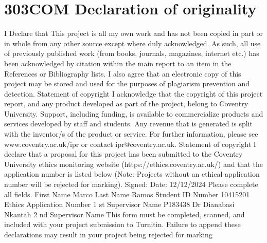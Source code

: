 \section*{303COM Declaration of originality}
I Declare that This project is all my own work and has not been 
copied in part or in whole from any
other source except where duly acknowledged. As such, all use of 
previously published work (from
books, journals, magazines, internet etc.) has been acknowledged 
by citation within the main report
to an item in the References or Bibliography lists. I also agree 
that an electronic copy of this project
may be stored and used for the purposes of plagiarism prevention 
and detection.
Statement of copyright
I acknowledge that the copyright of this project report, and any 
product developed as part of the
project, belong to Coventry University. Support, including 
funding, is available to commercialize
products and services developed by staff and students. Any 
revenue that is generated is split with the
inventor/s of the product or service. For further information, 
please see www.coventry.ac.uk/ipr or
contact ipr@coventry.ac.uk.
Statement of copyright
I declare that a proposal for this project has been submitted to 
the Coventry University ethics
monitoring website (https://ethics.coventry.ac.uk/) and that the 
application number is listed below
(Note: Projects without an ethical application number will be 
rejected for marking).
Signed: Date: 12/12/2024
Please complete all fields.
First Name
Marco
Last Name
Ramos
Student ID Number
10415201
Ethics Application Number
1 st Supervisor Name
P183438
Dr Dianabasi Nkantah
2 nd Supervisor Name
This form must be completed, scanned, and included with your 
project submission to Turnitin. Failure to append
these declarations may result in your project being rejected for 
marking
